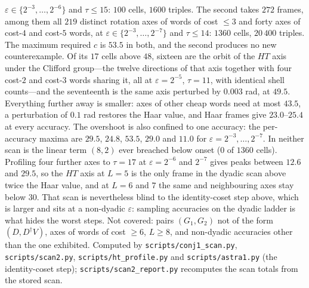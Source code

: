 \documentclass[aps,prx,twocolumn,superscriptaddress,nofootinbib,longbibliography]{revtex4-2}
\theoremstyle{plain}
\theoremstyle{definition}
\theoremstyle{remark}
\begin{document}
$\varepsilon\in\{2^{-3},\dots,2^{-6}\}$ and $\tau\le15$: $100$ cells, $1600$ triples. The second takes $272$ frames, among them all $219$ distinct rotation axes of words of cost $\le3$ and forty axes of cost-$4$ and cost-$5$ words, at $\varepsilon\in\{2^{-3},\dots,2^{-7}\}$ and $\tau\le14$: $1360$ cells, $20\,400$ triples. The maximum required $c$ is $53.5$ in both, and the second produces no new counterexample. Of its $17$ cells above $48$, sixteen are the orbit of the $HT$ axis under the Clifford group---the twelve directions of that axis together with four cost-$2$ and cost-$3$ words sharing it, all at $\varepsilon=2^{-5}$, $\tau=11$, with identical shell counts---and the seventeenth is the same axis perturbed by $0.003$ rad, at $49.5$. Everything further away is smaller: axes of other cheap words need at most $43.5$, a perturbation of $0.1$ rad restores the Haar value, and Haar frames give $23.0$--$25.4$ at every accuracy. The overshoot is also confined to one accuracy: the per-accuracy maxima are $29.5$, $24.8$, $\mathbf{53.5}$, $29.0$ and $11.0$ for $\varepsilon=2^{-3},\dots,2^{-7}$. In neither scan is the linear term $(8,2)$ ever breached below onset ($0$ of $1360$ cells). Profiling four further axes to $\tau=17$ at $\varepsilon=2^{-6}$ and $2^{-7}$ gives peaks between $12.6$ and $29.5$, so the $HT$ axis at $L=5$ is the only frame in the dyadic scan above twice the Haar value, and at $L=6$ and $7$ the same and neighbouring axes stay below $30$. That scan is nevertheless blind to the identity-coset step above, which is larger and sits at a non-dyadic $\varepsilon$: sampling accuracies on the dyadic ladder is what hides the worst steps. Not covered: pairs $(G_1,G_2)$ not of the form $(D,D^\dagger V)$, axes of words of cost $\ge6$, $L\ge8$, and non-dyadic accuracies other than the one exhibited. Computed by \texttt{scripts/conj1\_scan.py}, \texttt{scripts/scan2.py}, \texttt{scripts/ht\_profile.py} and \texttt{scripts/astra1.py} (the identity-coset step); \texttt{scripts/scan2\_report.py} recomputes the scan totals from the stored scan.
\end{document}

